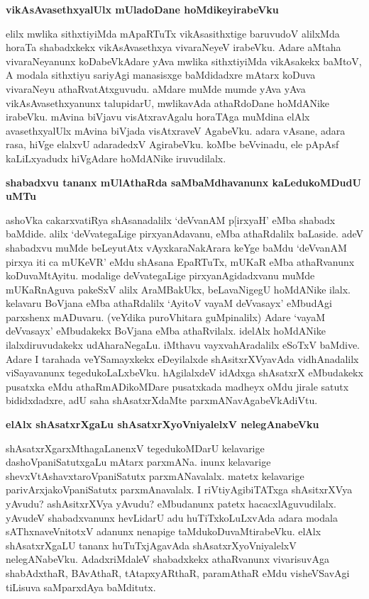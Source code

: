 {\bf vikAsAvasethxyalUlx mUladoDane hoMdikeyirabeVku}

elilx mwlika sithxtiyiMda mApaRTuTx vikAsasithxtige baruvudoV alilxMda horaTa shabadxkekx vikAsAvasethxya vivaraNeyeV irabeVku. Adare aMtaha vivaraNeyanunx koDabeVkAdare yAva mwlika sithxtiyiMda vikAsakekx baMtoV, A modala sithxtiyu sariyAgi manasisxge baMdidadxre mAtarx koDuva vivaraNeyu athaRvatAtxguvudu. aMdare muMde mumde yAva yAva vikAsAvasethxyanunx talupidarU, mwlikavAda athaRdoDane hoMdANike irabeVku. mAvina biVjavu visAtxravAgalu horaTAga muMdina elAlx avasethxyalUlx mAvina biVjada visAtxraveV AgabeVku. adara vAsane, adara rasa, hiVge elalxvU adaradedxV AgirabeVku. koMbe beVvinadu, ele pApAsf kaLiLxyadudx hiVgAdare hoMdANike iruvudilalx.

{\bf shabadxvu tananx mUlAthaRda saMbaMdhavanunx kaLedukoMDudU uMTu}

ashoVka cakarxvatiRya shAsanadalilx `deVvanAM p[irxyaH' eMba shabadx baMdide. alilx `deVvategaLige pirxyanAdavanu, eMba athaRdalilx baLaside. adeV shabadxvu muMde beLeyutAtx vAyxkaraNakArara keYge baMdu `deVvanAM pirxya iti ca mUKeVR' eMdu shAsana EpaRTuTx, mUKaR eMba athaRvanunx koDuvaMtAyitu. modalige deVvategaLige pirxyanAgidadxvanu muMde mUKaRnAguva pakeSxV alilx AraMBakUkx, beLavaNigegU hoMdANike ilalx. kelavaru BoVjana eMba athaRdalilx `AyitoV vayaM deVvasayx' eMbudAgi parxshenx mADuvaru. (veYdika puroVhitara guMpinalilx) Adare `vayaM deVvasayx' eMbudakekx BoVjana eMba athaRvilalx. idelAlx hoMdANike ilalxdiruvudakekx udAharaNegaLu. iMthavu vayxvahAradalilx eSoTxV baMdive. Adare I tarahada veYSamayxkekx eDeyilalxde shAsitxrXVyavAda vidhAnadalilx viSayavanunx tegedukoLaLxbeVku. hAgilalxdeV idAdxga shAsatxrX eMbudakekx pusatxka eMdu athaRmADikoMDare pusatxkada madheyx oMdu jirale satutx bididxdadxre, adU saha shAsatxrXdaMte parxmANavAgabeVkAdiVtu.

{\bf elAlx shAsatxrXgaLu shAsatxrXyoVniyalelxV nelegAnabeVku}

shAsatxrXgarxMthagaLanenxV tegedukoMDarU kelavarige dashoVpaniSatutxgaLu mAtarx parxmANa. inunx kelavarige shevxVtAshavxtaroVpaniSatutx parxmANavalalx. matetx kelavarige parivArxjakoVpaniSatutx parxmAnavalalx. I riVtiyAgibiTATxga shAsitxrXVya yAvudu? ashAsitxrXVya yAvudu? eMbudanunx patetx hacacxlAguvudilalx. yAvudeV shabadxvanunx hevLidarU adu huTiTxkoLuLxvAda adara modala sAThxnaveVnitotxV adanunx nenapige taMdukoDuvaMtirabeVku. elAlx shAsatxrXgaLU tananx huTuTxjAgavAda shAsatxrXyoVniyalelxV nelegANabeVku. AdadxriMdaleV shabadxkekx athaRvanunx vivarisuvAga shabAdxthaR, BAvAthaR, tAtapxyARthaR, paramAthaR eMdu visheVSavAgi tiLisuva saMparxdAya baMditutx.

